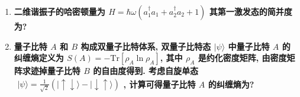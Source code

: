 \documentclass[../../main.tex]{subfiles}
\begin{document}
\begin{enumerate}
{}
  
  \item \textbf{二维谐振子的哈密顿量为 $H = \hbar\omega\left(a_{1}^{\dagger}a_{1} + a_{2}^{\dagger}a_{2} + 1\right)$ 其第一激发态的简并度为?}
  
{}
  
  \item \textbf{量子比特 $A$ 和 $B$ 构成双量子比特体系, 双量子比特态 $|\psi\rangle$ 中量子比特 $A$ 的纠缠熵定义为 $S(A) = -\text{Tr}[\rho_{A}\ln{\rho_{A}}]$, 其中 $\rho_{A}$ 是约化密度矩阵, 由密度矩阵求迹掉量子比特 $B$ 的自由度得到. 考虑自旋单态 $\begin{aligned}
    |\psi\rangle = \frac{1}{\sqrt{2}}\left(|\uparrow\downarrow\rangle - |\downarrow\uparrow\rangle\right)
  \end{aligned}$, 计算可得量子比特 $A$ 的纠缠熵为?}


\end{enumerate}
\end{document}
